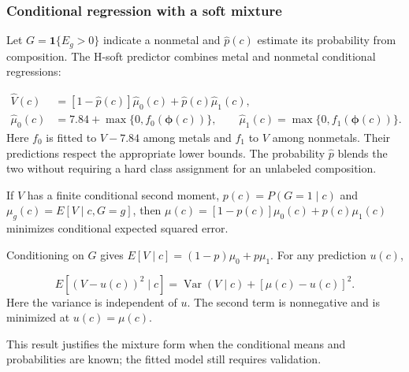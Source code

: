 \subsubsection{Conditional regression with a soft mixture}
Let $G=\mathbf{1}\{E_g>0\}$ indicate a nonmetal and $\widehat p(c)$ estimate its probability from composition. The H-soft predictor combines metal and nonmetal conditional regressions:
\begin{samepage}
\begin{equation}
 \begin{aligned}
 \widehat V(c)&=[1-\widehat p(c)]\widehat\mu_0(c)
                  +\widehat p(c)\widehat\mu_1(c),\\
 \widehat\mu_0(c)&=7.84+\max\{0,f_0(\boldsymbol\phi(c))\},\qquad
 \widehat\mu_1(c)=\max\{0,f_1(\boldsymbol\phi(c))\}.
 \end{aligned}
 \label{eq:mixture}
\end{equation}
\noindent Here $f_0$ is fitted to $V-7.84$ among metals and $f_1$ to $V$ among nonmetals. Their predictions respect the appropriate lower bounds. The probability $\widehat p$ blends the two without requiring a hard class assignment for an unlabeled composition.
\end{samepage}

\begin{proposition}\label{prop:mixture}
If $V$ has a finite conditional second moment, $p(c)=P(G=1\mid c)$ and $\mu_g(c)=E[V\mid c,G=g]$, then $\mu(c)=[1-p(c)]\mu_0(c)+p(c)\mu_1(c)$ minimizes conditional expected squared error.
\end{proposition}
\begin{p1proof}
Conditioning on $G$ gives $E[V\mid c]=(1-p)\mu_0+p\mu_1$. For any prediction $u(c)$,
\begin{samepage}
\begin{equation}
 E[(V-u(c))^2\mid c]
 =\operatorname{Var}(V\mid c)+[\mu(c)-u(c)]^2.
 \label{eq:squared-risk}
\end{equation}
\noindent Here the variance is independent of $u$. The second term is nonnegative and is minimized at $u(c)=\mu(c)$.
\end{samepage}
\end{p1proof}

This result justifies the mixture form when the conditional means and probabilities are known; the fitted model still requires validation.

